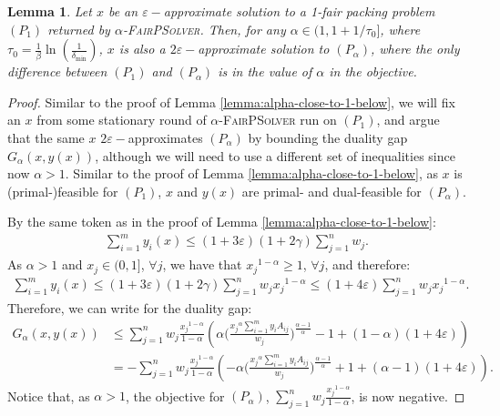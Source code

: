 \documentclass[11pt]{article}
\newtheorem{lemma}[theorem]{Lemma}
\newif\iffullpaper
\begin{document}
\begin{lemma}\label{lemma:alpha-close-to-1-above}
Let $x$ be an $\varepsilon-$approximate solution to a 1-fair packing problem $(P_1)$ returned by \textsc{$\alpha$-FairPSolver}. Then, for any $\alpha \in (1, 1 + 1/{\tau_0}]$, where $\tau_0 = \frac{1}{\beta}\ln(\frac{1}{\delta_{\min}})$, $x$ is also a $2\varepsilon-$approximate solution to $(P_\alpha)$, where the only difference between $(P_1)$ and $(P_\alpha)$ is in the value of $\alpha$ in the objective.
\end{lemma}
\iffullpaper
\begin{proof}
Similar to the proof of Lemma \ref{lemma:alpha-close-to-1-below}, we will fix an $x$ from some stationary round of \textsc{$\alpha$-FairPSolver} run on $(P_1)$, and argue that the same $x$ $2\varepsilon-$approximates $(P_\alpha)$ by bounding the duality gap $G_{\alpha}(x, y(x))$, although we will need to use a different set of inequalities since now $\alpha > 1$. Similar to the proof of Lemma \ref{lemma:alpha-close-to-1-below}, as $x$ is (primal-)feasible for $(P_1)$, $x$ and $y(x)$ are primal- and dual-feasible for $(P_\alpha)$.

By the same token as in the proof of Lemma \ref{lemma:alpha-close-to-1-below}:
\begin{align*}
\sum_{i=1}^m y_i (x) \leq (1+3\varepsilon)(1+2\gamma)\sum_{j=1}^n w_j.
\end{align*}
As $\alpha > 1$ and $x_j \in (0, 1]$, $\forall j$, we have that ${x_j}^{1-\alpha}\geq 1$, $\forall j$, and therefore:
\begin{align}\label{eq:alpha-above-1-bnd-1}
\sum_{i=1}^m y_i (x) \leq (1+3\varepsilon)(1+2\gamma)\sum_{j=1}^n w_j {x_j}^{1-\alpha} \leq (1+4\varepsilon)\sum_{j=1}^n w_j {x_j}^{1-\alpha}.
\end{align}
Therefore, we can write for the duality gap:
\begin{align}
G_{\alpha}(x, y(x))&\leq \sum_{j=1}^n w_j \frac{{x_j}^{1-\alpha}}{1-\alpha} \left(\alpha\Big(\frac{{x_j}^{\alpha}\sum_{i=1}^m y_i A_{ij}}{w_j}\Big)^{\frac{\alpha-1}{\alpha}}-1 + (1-\alpha)(1+4\varepsilon)\right)\\
&= -\sum_{j=1}^n w_j \frac{{x_j}^{1-\alpha}}{1-\alpha} \left(-\alpha\Big(\frac{{x_j}^{\alpha}\sum_{i=1}^m y_i A_{ij}}{w_j}\Big)^{\frac{\alpha-1}{\alpha}} + 1 + (\alpha-1)(1+4\varepsilon)\right)
\label{eq:alpha-above-1-duality-gap}.
\end{align}
Notice that, as $\alpha >1$, the objective for $(P_\alpha)$, $\sum_{j=1}^n w_j \frac{{x_j}^{1-\alpha}}{1-\alpha}$, is now negative.


\end{proof}
\end{document}
